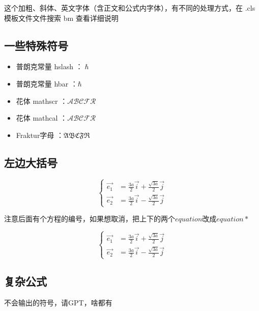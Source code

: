 \documentclass[AutoFakeBold]{LUTThesis}
\begin{document}
这个加粗、斜体、英文字体（含正文和公式内字体），有不同的处理方式，在 .cls 模板文件文件搜索 bm 查看详细说明

\subsection{一些特殊符号}

\begin{itemize}
    \item 普朗克常量 hslash ：$\hslash$
    \item 普朗克常量 hbar ：$\hbar$
    \item 花体 mathscr ：$\mathscr{ABCFR}$
    \item 花体 mathcal ：$\mathcal{ABCFR}$
    \item Fraktur字母 ：$\mathfrak{ABCFR}$
\end{itemize}




\subsection{左边大括号} %
\label{sub:左边大括号}

\begin{equation}
    \left\{
    \begin{array}{rcl}
        \vec{e_1} & = \frac{3a}{2} \vec{i} + \frac{\sqrt{3a}}{2} \vec{j} \\
        \vec{e_2} & = \frac{3a}{2} \vec{i} - \frac{\sqrt{3a}}{2} \vec{j}
    \end{array}
    \right.
    \label{e1e2}
\end{equation}

注意后面有个方程的编号，如果想取消，把上下的两个$equation$改成$equation*$

\begin{equation*}
    \left\{
    \begin{array}{rcl}
        \vec{e_1} & = \frac{3a}{2} \vec{i} + \frac{\sqrt{3a}}{2} \vec{j} \\
        \vec{e_2} & = \frac{3a}{2} \vec{i} - \frac{\sqrt{3a}}{2} \vec{j}
    \end{array}
    \right.
    \label{e1e2_2}
\end{equation*}


\subsection{复杂公式} %
\label{sub:复杂公式}
不会输出的符号，请GPT，啥都有
\end{document}
